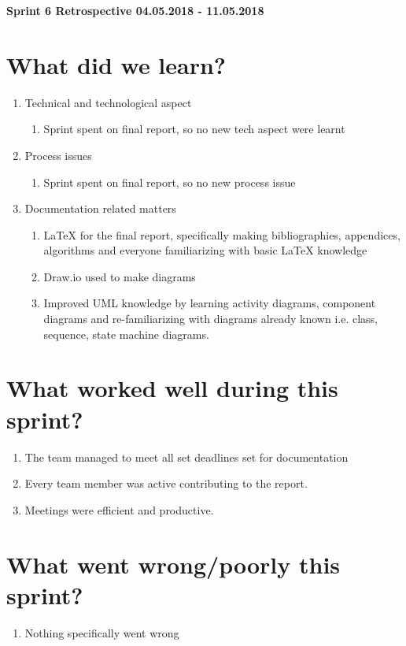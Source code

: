 \documentclass[11pt]{article}
\begin{document}
\centerline{\textbf{\LARGE Sprint 6 Retrospective 04.05.2018 - 11.05.2018}}

\section*{What did we learn?}
\begin{enumerate}
	\item Technical and technological aspect
		\begin{enumerate} 
			\item Sprint spent on final report, so no new tech aspect were learnt
		\end{enumerate} 
	\item Process issues
		\begin{enumerate} 
			\item Sprint spent on final report, so no new process issue
		\end{enumerate}		
	\item Documentation related matters
		\begin{enumerate} 
			\item LaTeX for the final report, specifically making bibliographies, appendices, algorithms and everyone familiarizing with basic LaTeX knowledge
			\item Draw.io used to make diagrams
			\item Improved UML knowledge by learning activity diagrams, component diagrams and re-familiarizing with diagrams already known i.e. class, sequence, state machine diagrams.
		\end{enumerate}	
\end{enumerate} 

\section*{What worked well during this sprint?}
\begin{enumerate}
	\item The team managed to meet all set deadlines set for documentation
	\item Every team member was active contributing to the report.
	\item Meetings were efficient and productive.
\end{enumerate} 

\section*{What went wrong/poorly this sprint?}
\begin{enumerate}
	\item Nothing specifically went wrong
\end{enumerate} 
\end{document}

